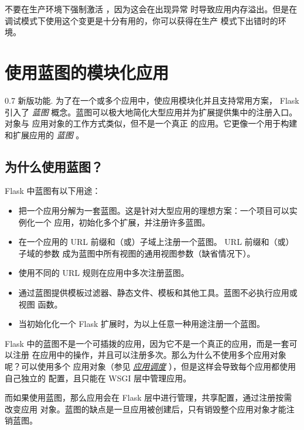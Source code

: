 \documentclass[a4paper,12pt]{sphinxmanual}
\begin{document}
不要在生产环境下强制激活  ，因为这会在出现异常
时导致应用内存溢出。但是在调试模式下使用这个变更是十分有用的，你可以获得在生产
模式下出错时的环境。


\chapter{使用蓝图的模块化应用}
\label{blueprints:blueprints}\label{blueprints::doc}\label{blueprints:id1}0.7 新版功能.
为了在一个或多个应用中，使应用模块化并且支持常用方案， Flask 引入了 \emph{蓝图}
概念。蓝图可以极大地简化大型应用并为扩展提供集中的注册入口。
 对象与  应用对象的工作方式类似，但不是一个真正
的应用。它更像一个用于构建和扩展应用的 \emph{蓝图} 。


\section{为什么使用蓝图？}
\label{blueprints:id2}
Flask 中蓝图有以下用途：
\begin{itemize}
\item {} 
把一个应用分解为一套蓝图。这是针对大型应用的理想方案：一个项目可以实例化一个
应用，初始化多个扩展，并注册许多蓝图。

\item {} 
在一个应用的 URL 前缀和（或）子域上注册一个蓝图。 URL 前缀和（或）子域的参数
成为蓝图中所有视图的通用视图参数（缺省情况下）。

\item {} 
使用不同的 URL 规则在应用中多次注册蓝图。

\item {} 
通过蓝图提供模板过滤器、静态文件、模板和其他工具。蓝图不必执行应用或视图
函数。

\item {} 
当初始化化一个 Flask 扩展时，为以上任意一种用途注册一个蓝图。

\end{itemize}

Flask 中的蓝图不是一个可插拨的应用，因为它不是一个真正的应用，而是一套可以注册
在应用中的操作，并且可以注册多次。那么为什么不使用多个应用对象呢？可以使用多个
应用对象（参见 {\hyperref[patterns/appdispatch:app-dispatch]{\emph{应用调度}}} ），但是这样会导致每个应用都使用自己独立的
配置，且只能在 WSGI 层中管理应用。

而如果使用蓝图，那么应用会在 Flask 层中进行管理，共享配置，通过注册按需改变应用
对象。蓝图的缺点是一旦应用被创建后，只有销毁整个应用对象才能注销蓝图。
\end{document}
